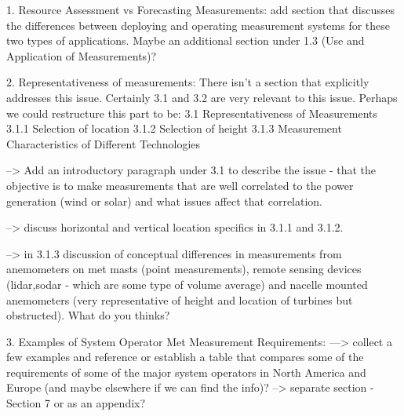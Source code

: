 


1. Resource Assessment vs Forecasting Measurements: add section that discusses the differences between deploying and operating measurement systems for these two types of applications.
         Maybe an additional section under 1.3 (Use and Application of Measurements)?

 2. Representativeness of measurements:  There isn’t a section that explicitly addresses this issue.
         Certainly 3.1 and 3.2 are very relevant to this issue. Perhaps we could restructure this part to be:
        3.1 Representativeness of Measurements
        3.1.1 Selection of location
        3.1.2 Selection of height
        3.1.3 Measurement Characteristics of Different Technologies

        --> Add an introductory paragraph under 3.1 to describe the issue - that the objective is to make measurements that are well correlated to the power generation (wind or solar) and what issues affect that correlation. 

        --> discuss horizontal and vertical location specifics in 3.1.1 and 3.1.2.

        --> in 3.1.3 discussion of conceptual differences in measurements from anemometers on met masts (point measurements), remote sensing devices
        (lidar,sodar - which are some type of volume average) and nacelle mounted anemometers (very representative of height and location of turbines but obstructed). What do you thinks?

 3. Examples of System Operator Met Measurement Requirements:  ---> collect a few examples and reference or establish a table that compares some of the requirements of some of the major
           system operators in North America and Europe (and maybe elsewhere if we can find the info)?
     --> separate section - Section 7 or as an appendix?